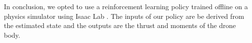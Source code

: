 \documentclass{report_template_oxford}
\begin{document}

In conclusion, we opted to use a reinforcement learning policy trained offline on a physics simulator using Isaac Lab \cite{IsaacLab}. The inputs of our policy are be derived from the estimated state and the outputs are the thrust and moments of the drone body.
\end{document}
